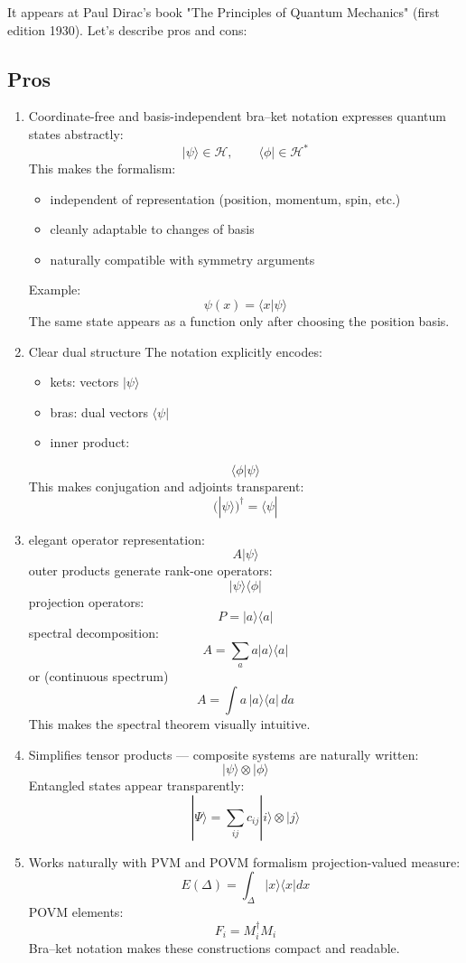 It appears at Paul Dirac's book \cite{dirac-pqm}  "The Principles of Quantum Mechanics" (first edition 1930). Let's describe pros and cons:
\subsection{ Pros}
\begin{enumerate}
   \item
 Coordinate-free and basis-independent
bra--ket notation expresses quantum states abstractly:
\[|\psi\rangle \in \mathcal{H}, \qquad \langle \phi| \in \mathcal{H}^*\]
This makes the formalism:
\begin{itemize}
\item
  independent of representation (position, momentum, spin, etc.)
\item
  cleanly adaptable to changes of basis
\item
  naturally compatible with symmetry arguments
\end{itemize}
Example:
\[\psi(x) = \langle x|\psi\rangle\]
The same state appears as a function only after choosing the position
basis.
\item
 Clear dual structure
  The notation explicitly encodes:
\begin{itemize}
\item
  kets: vectors \(|\psi\rangle\)
\item
  bras: dual vectors \(\langle\psi|\)
\item
  inner product:
\end{itemize}
\[\langle \phi | \psi \rangle\]
This makes conjugation and adjoints transparent:
\[(|\psi\rangle)^\dagger = \langle \psi|\]
\item
elegant operator representation:
\[A|\psi\rangle\]
outer products generate rank-one operators:
\[|\psi\rangle\langle\phi|\]
projection operators:
\[P = |a\rangle\langle a|\]
spectral decomposition:
\[A = \sum_a a |a\rangle\langle a|\]
or (continuous spectrum)
\[A = \int a\, |a\rangle\langle a|\, da\]
This makes the spectral theorem visually intuitive.
\item
Simplifies tensor products ---
composite systems are naturally written:
\[|\psi\rangle \otimes |\phi\rangle\]
Entangled states appear transparently:
\[|\Psi\rangle = \sum_{ij} c_{ij} |i\rangle \otimes |j\rangle\]
\item
Works naturally with PVM and POVM formalism
projection-valued measure:
\[E(\Delta) = \int_\Delta |x\rangle\langle x| dx\]
POVM elements:
\[F_i = M_i^\dagger M_i\]
Bra--ket notation makes these constructions compact and readable.
\end{enumerate}


